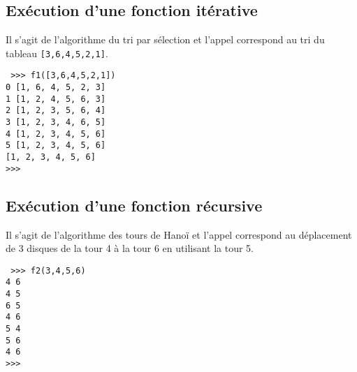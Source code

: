 \documentclass[11pt,a4paper]{article}
\begin{document}
\subsection{Exécution d'une fonction itérative}

\begin{minipage}[t]{10cm}
Il s'agit de l'algorithme du tri par sélection
et l'appel correspond au tri du tableau {\tt [3,6,4,5,2,1]}.
\end{minipage}
\hfill
\begin{py}{4cm}\tt
>>> f1([3,6,4,5,2,1])\\
0 [1, 6, 4, 5, 2, 3]\\
1 [1, 2, 4, 5, 6, 3]\\
2 [1, 2, 3, 5, 6, 4]\\
3 [1, 2, 3, 4, 6, 5]\\
4 [1, 2, 3, 4, 5, 6]\\
5 [1, 2, 3, 4, 5, 6]\\
\mbox{}[1, 2, 3, 4, 5, 6]\\
>>>
\mbox{}
\end{py}



\subsection{Exécution d'une fonction récursive}
\begin{minipage}[t]{10cm}

Il s'agit de l'algorithme des tours de Hanoï
et l'appel correspond au déplacement de 3 disques de la tour 4 à la tour 6
en utilisant la tour 5.
\end{minipage}
\hfill
\begin{py}{4cm}\tt
>>> f2(3,4,5,6)\\
4 6\\
4 5\\
6 5\\
4 6\\
5 4\\
5 6\\
4 6\\
>>>
\mbox{}
\end{py}


\label{fini}
\end{document}

